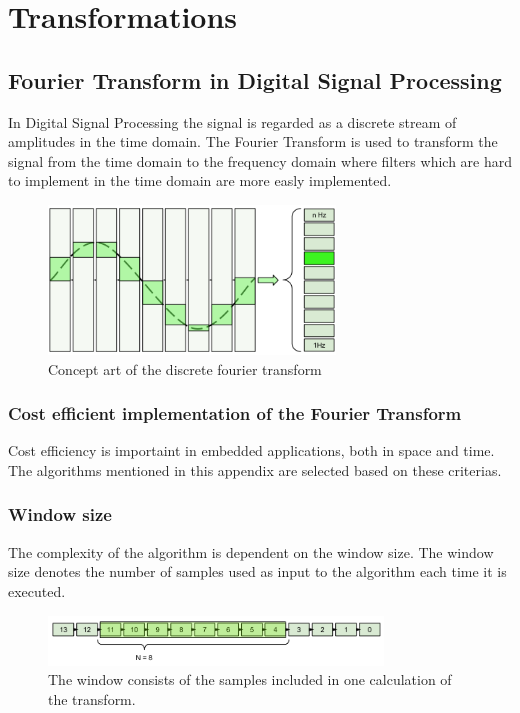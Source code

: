 \chapter{Transformations}
\section{Fourier Transform in Digital Signal Processing}

In Digital Signal Processing the signal is regarded as a discrete stream of amplitudes in the
time domain. The Fourier Transform is used to transform the signal from the time domain 
to the frequency domain where filters which are hard to implement in the time domain are
more easly implemented.

\begin{figure}[H]
    \centering
    \includegraphics[height=150px]{figures/theory/ft_conceptual}
    \caption{Concept art of the discrete fourier transform}
    \label{fig:ft_conceptual}
\end{figure}
\subsection{Cost efficient implementation of the Fourier Transform}

Cost efficiency is importaint in embedded applications, both in space and time. 
The algorithms mentioned in this appendix are selected based on these criterias.

\subsection{Window size}

The complexity of the algorithm is dependent on the window size. The window size
denotes the number of samples used as input to the algorithm each time it is executed.

\begin{figure}[H]
    \centering
    \includegraphics[height=50px]{figures/theory/dft_window}
    \caption{The window consists of the samples included in one calculation of the transform.}
    \label{fig:dft_window}
\end{figure}

